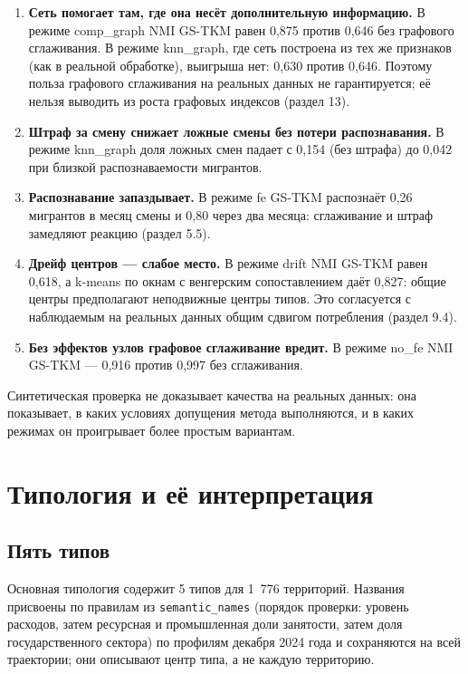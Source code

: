 \documentclass[11pt,a4paper]{article}
\providecommand{\tightlist}{\setlength{\itemsep}{1pt}\setlength{\parskip}{0pt}}
\begin{document}
\begin{enumerate}
\def\labelenumi{\arabic{enumi}.}
\tightlist
\item
  \textbf{Сеть помогает там, где она несёт дополнительную информацию.} В режиме comp\_graph NMI GS-TKM равен 0,875 против 0,646 без графового сглаживания. В режиме knn\_graph, где сеть построена из тех же признаков (как в реальной обработке), выигрыша нет: 0,630 против 0,646. Поэтому польза графового сглаживания на реальных данных не гарантируется; её нельзя выводить из роста графовых индексов (раздел 13).
\item
  \textbf{Штраф за смену снижает ложные смены без потери распознавания.} В режиме knn\_graph доля ложных смен падает с 0,154 (без штрафа) до 0,042 при близкой распознаваемости мигрантов.
\item
  \textbf{Распознавание запаздывает.} В режиме fe GS-TKM распознаёт 0,26 мигрантов в месяц смены и 0,80 через два месяца: сглаживание и штраф замедляют реакцию (раздел 5.5).
\item
  \textbf{Дрейф центров --- слабое место.} В режиме drift NMI GS-TKM равен 0,618, а k-means по окнам с венгерским сопоставлением даёт 0,827: общие центры предполагают неподвижные центры типов. Это согласуется с наблюдаемым на реальных данных общим сдвигом потребления (раздел 9.4).
\item
  \textbf{Без эффектов узлов графовое сглаживание вредит.} В режиме no\_fe NMI GS-TKM --- 0,916 против 0,997 без сглаживания.
\end{enumerate}

Синтетическая проверка не доказывает качества на реальных данных: она показывает, в каких условиях допущения метода выполняются, и в каких режимах он проигрывает более простым вариантам.

\section{Типология и её интерпретация}\label{ux442ux438ux43fux43eux43bux43eux433ux438ux44f-ux438-ux435ux451-ux438ux43dux442ux435ux440ux43fux440ux435ux442ux430ux446ux438ux44f}

\subsection{Пять типов}\label{ux43fux44fux442ux44c-ux442ux438ux43fux43eux432}

Основная типология содержит 5 типов для 1~776 территорий. Названия присвоены по правилам из \texttt{semantic\_\allowbreak{}names} (порядок проверки: уровень расходов, затем ресурсная и промышленная доли занятости, затем доля государственного сектора) по профилям декабря 2024 года и сохраняются на всей траектории; они описывают центр типа, а не каждую территорию.
\end{document}
